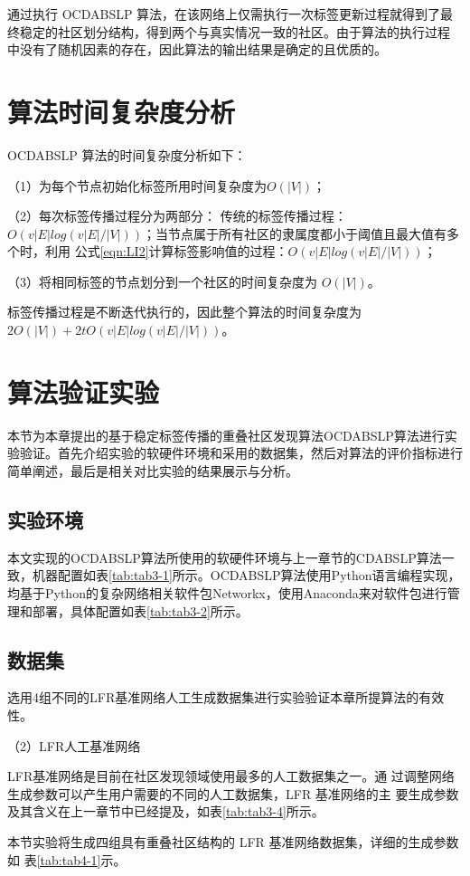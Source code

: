 通过执行 OCDABSLP 算法，在该网络上仅需执行一次标签更新过程就得到了最
终稳定的社区划分结构，得到两个与真实情况一致的社区。由于算法的执行过程
中没有了随机因素的存在，因此算法的输出结果是确定的且优质的。 

\section{算法时间复杂度分析}
OCDABSLP 算法的时间复杂度分析如下： 

（1）为每个节点初始化标签所用时间复杂度为$ O(|V|)$； 

（2）每次标签传播过程分为两部分： 传统的标签传播过程：$O(v|E|log(v|E|/|V|))$；当节点属于所有社区的隶属度都小于阈值且最大值有多个时，利用
公式\ref{eqn:LI2}计算标签影响值的过程：$O(v|E|log(v|E|/|V|))$； 

（3）将相同标签的节点划分到一个社区的时间复杂度为 $O(|V|)$。 

标签传播过程是不断迭代执行的，因此整个算法的时间复杂度为
$2O(|V|)+2tO(v|E|log(v|E|/|V|))$。

\section{算法验证实验}
本节为本章提出的基于稳定标签传播的重叠社区发现算法OCDABSLP算法进行实验验证。首先介绍实验的软硬件环境和采用的数据集，然后对算法的评价指标进行简单阐述，最后是相关对比实验的结果展示与分析。

\subsection{实验环境}
本文实现的OCDABSLP算法所使用的软硬件环境与上一章节的CDABSLP算法一致，机器配置如表\ref{tab:tab3-1}所示。OCDABSLP算法使用Python语言编程实现，均基于Python的复杂网络相关软件包Networkx，使用Anaconda来对软件包进行管理和部署，具体配置如表\ref{tab:tab3-2}所示。

\subsection{数据集}
选用4组不同的LFR基准网络人工生成数据集进行实验验证本章所提算法的有效性。 

（2）LFR人工基准网络

LFR基准网络是目前在社区发现领域使用最多的人工数据集之一。通
过调整网络生成参数可以产生用户需要的不同的人工数据集，LFR 基准网络的主
要生成参数及其含义在上一章节中已经提及，如表\ref{tab:tab3-4}所示。

本节实验将生成四组具有重叠社区结构的 LFR 基准网络数据集，详细的生成参数如
表\ref{tab:tab4-1}示。 

